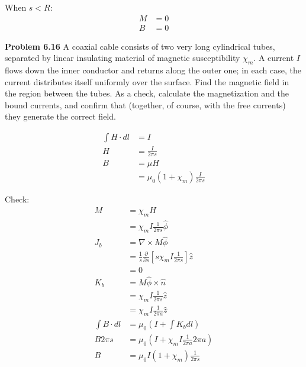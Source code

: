 \documentclass{article}
\begin{document}
When $s < R$:
\begin{equation*}
\begin{split}
	M & = 0 \\
	B & = \boxed{0}
\end{split}
\end{equation*}

\textbf{Problem 6.16}
A coaxial cable consists of two very long cylindrical tubes, separated by linear insulating material of magnetic susceptibility $\chi_m$.
A current $I$ flows down the inner conductor and returns along the outer one; in each case, the current distributes itself uniformly over the surface.
Find the magnetic field in the region between the tubes.
As a check, calculate the magnetization and the bound currents, and confirm that (together, of course, with the free currents) they generate the correct field.

\begin{equation*}
\begin{split}
	\int H \cdot dl & = I \\
	H & = \frac{I}{2 \pi s} \\
	B & = \mu H \\
	& = \boxed{\mu_0 (1 + \chi_m) \frac{I}{2 \pi s}}
\end{split}
\end{equation*}

Check:
\begin{equation*}
\begin{split}
	M & = \chi_m H \\
	& = \chi_m I \frac{1}{2 \pi s} \hat{\phi} \\
	J_b & = \nabla \times M \hat{\phi} \\
	& = \frac{1}{s} \frac{\partial}{\partial s} [s \chi_m I \frac{1}{2 \pi s}] \hat{z} \\
	& = 0 \\
	K_b & = M \hat{\phi} \times \hat{n} \\
	& = \chi_m I \frac{1}{2 \pi s} \hat{z} \\
	& = \chi_m I \frac{1}{2 \pi a} \hat{z} \\
	\int B \cdot dl & = \mu_0 (I + \int K_b dl) \\
	B 2 \pi s & = \mu_0 (I + \chi_m I \frac{1}{2 \pi a} 2 \pi a) \\
	B & = \mu_0 I (1 + \chi_m) \frac{1}{2 \pi s}
\end{split}
\end{equation*}
\end{document}
